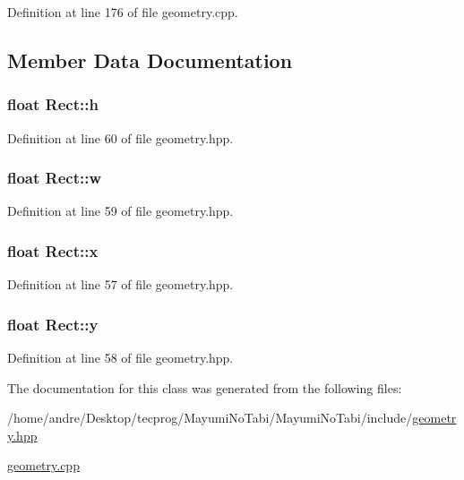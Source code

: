 Definition at line 176 of file geometry.\-cpp.



\subsection{Member Data Documentation}
\hypertarget{class_rect_aa10c9b8950c6b23a0b2bf0d39f2be904}{
\subsubsection[{h}]{\setlength{\rightskip}{0pt plus 5cm}float Rect\-::h}}\label{class_rect_aa10c9b8950c6b23a0b2bf0d39f2be904}


Definition at line 60 of file geometry.\-hpp.

\hypertarget{class_rect_a049f7ee5e7eb0475229bf3ed9b3bad44}{
\subsubsection[{w}]{\setlength{\rightskip}{0pt plus 5cm}float Rect\-::w}}\label{class_rect_a049f7ee5e7eb0475229bf3ed9b3bad44}


Definition at line 59 of file geometry.\-hpp.

\hypertarget{class_rect_a29bc9b88a8c5537620f05ac7069f48cc}{
\subsubsection[{x}]{\setlength{\rightskip}{0pt plus 5cm}float Rect\-::x}}\label{class_rect_a29bc9b88a8c5537620f05ac7069f48cc}


Definition at line 57 of file geometry.\-hpp.

\hypertarget{class_rect_a4ea33d8210fa0b8b0d6ef3f7e06e6b27}{
\subsubsection[{y}]{\setlength{\rightskip}{0pt plus 5cm}float Rect\-::y}}\label{class_rect_a4ea33d8210fa0b8b0d6ef3f7e06e6b27}


Definition at line 58 of file geometry.\-hpp.



The documentation for this class was generated from the following files\-:\begin{DoxyCompactItemize}
\item 
/home/andre/\-Desktop/tecprog/\-Mayumi\-No\-Tabi/\-Mayumi\-No\-Tabi/include/\hyperlink{geometry_8hpp}{geometry.\-hpp}\item 
\hyperlink{geometry_8cpp}{geometry.\-cpp}\end{DoxyCompactItemize}
